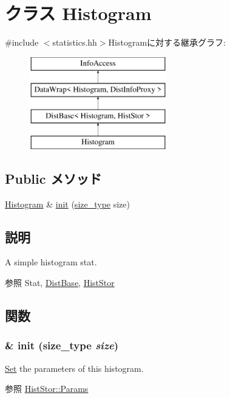 \hypertarget{classStats_1_1Histogram}{
\section{クラス Histogram}
\label{classStats_1_1Histogram}
}


{\ttfamily \#include $<$statistics.hh$>$}Histogramに対する継承グラフ:\begin{figure}[H]
\begin{center}
\leavevmode
\includegraphics[height=4cm]{classStats_1_1Histogram}
\end{center}
\end{figure}
\subsection*{Public メソッド}
\begin{DoxyCompactItemize}
\item 
\hyperlink{classStats_1_1Histogram}{Histogram} \& \hyperlink{classStats_1_1Histogram_a0478d941e230faacf754710bf188a6c9}{init} (\hyperlink{namespaceStats_ada51e68d31936547d3729c82daf6b7c6}{size\_\-type} size)
\end{DoxyCompactItemize}


\subsection{説明}
A simple histogram stat. \begin{DoxySeeAlso}{参照}
Stat, \hyperlink{classStats_1_1DistBase}{DistBase}, \hyperlink{classStats_1_1HistStor}{HistStor} 
\end{DoxySeeAlso}


\subsection{関数}
\hypertarget{classStats_1_1Histogram_a0478d941e230faacf754710bf188a6c9}{
\subsubsection[{init}]{\& init ({\bf size\_\-type} {\em size})}}
\label{classStats_1_1Histogram_a0478d941e230faacf754710bf188a6c9}
\hyperlink{classSet}{Set} the parameters of this histogram. \begin{DoxySeeAlso}{参照}
\hyperlink{structStats_1_1HistStor_1_1Params}{HistStor::Params} 
\end{DoxySeeAlso}

